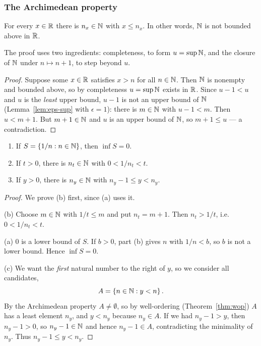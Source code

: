 \subsubsection{The Archimedean property}
\begin{theorem}\label{thm:archimedes}
    For every $x \in \mathbb{R}$ there is $n_x \in \mathbb{N}$ with $x \leq n_x$.
    In other words, $\mathbb{N}$ is not bounded above in $\mathbb{R}$.
\end{theorem}

The proof uses two ingredients: completeness, to form $u=\sup\mathbb{N}$, and the
closure of $\mathbb{N}$ under $n\mapsto n+1$, to step beyond $u$.

\begin{proof}
    Suppose some $x \in \mathbb{R}$ satisfies $x > n$ for all $n \in \mathbb{N}$. Then $\mathbb{N}$
    is nonempty and bounded above, so by completeness $u = \sup \mathbb{N}$ exists in
    $\mathbb{R}$. Since $u - 1 < u$ and $u$ is the \emph{least} upper bound, $u-1$ is
    not an upper bound of $\mathbb{N}$ (Lemma~\ref{lem:eps-sup} with $\epsilon=1$):
    there is $m \in \mathbb{N}$ with $u - 1 < m$. Then $u < m+1$. But $m + 1 \in \mathbb{N}$
    and $u$ is an upper bound of $\mathbb{N}$, so $m+1\leq u$ --- a contradiction.
\end{proof}

\begin{corollary}\label{cor:archimedes}
    \leavevmode
    \begin{enumerate}[label=(\alph*)]
        \item If $S = \left\{1/n : n \in \mathbb{N}\right\}$, then $\inf S = 0$.
        \item If $t > 0$, there is $n_t \in \mathbb{N}$ with $0 < 1/n_t < t$.
        \item If $y > 0$, there is $n_y \in \mathbb{N}$ with $n_y - 1 \leq y < n_y$.
    \end{enumerate}
\end{corollary}

\begin{proof}
    We prove (b) first, since (a) uses it.

    (b) Choose $m\in\mathbb{N}$ with $1/t\leq m$ and put $n_t=m+1$. Then
    $n_t>1/t$, i.e.\ $0<1/n_t<t$.

    (a) $0$ is a lower bound of $S$. If $b>0$, part (b) gives $n$ with
    $1/n<b$, so $b$ is not a lower bound. Hence $\inf S=0$.

    (c) We want the \emph{first} natural number to the right of $y$, so we
    consider all candidates,
    \begin{equation*}
        A=\left\{n\in\mathbb{N}:y<n\right\}.
    \end{equation*}
    By the Archimedean property $A\neq\emptyset$, so by well-ordering
    (Theorem~\ref{thm:wop}) $A$ has a least element $n_y$, and $y<n_y$
    because $n_y\in A$. If we had $n_y-1>y$, then $n_y-1>0$, so
    $n_y-1\in\mathbb{N}$ and hence $n_y-1\in A$, contradicting the minimality of
    $n_y$. Thus $n_y-1\leq y<n_y$.
\end{proof}


